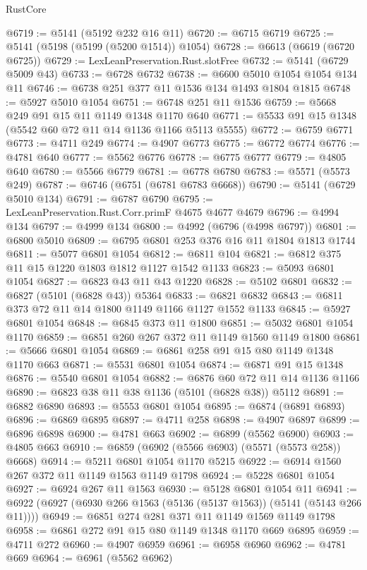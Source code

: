 \begin{lexlean}{RustCore}
\begin{coremodule}
@6719 := @5141 (@5192 @232 @16 @11)
@6720 := @6715 @6719
@6725 := @5141 (@5198 (@5199 (@5200 @1514)) @1054)
@6728 := @6613 (@6619 (@6720 @6725))
@6729 := LexLeanPreservation.Rust.slotFree
@6732 := @5141 (@6729 @5009 @43)
@6733 := @6728 @6732
@6738 := @6600 @5010 @1054 @1054 @134 @11
@6746 := @6738 @251 @377 @11 @1536 @134 @1493 @1804 @1815
@6748 := @5927 @5010 @1054
@6751 := @6748 @251 @11 @1536
@6759 := @5668 @249 @91 @15 @11 @1149 @1348 @1170 @640
@6771 := @5533 @91 @15 @1348 (@5542 @60 @72 @11 @14 @1136 @1166 @5113 @5555)
@6772 := @6759 @6771
@6773 := @4711 @249
@6774 := @4907 @6773
@6775 := @6772 @6774
@6776 := @4781 @640
@6777 := @5562 @6776
@6778 := @6775 @6777
@6779 := @4805 @640
@6780 := @5566 @6779
@6781 := @6778 @6780
@6783 := @5571 (@5573 @249)
@6787 := @6746 (@6751 (@6781 @6783 @6668))
@6790 := @5141 (@6729 @5010 @134)
@6791 := @6787 @6790
@6795 := LexLeanPreservation.Rust.Corr.primF @4675 @4677 @4679
@6796 := @4994 @134
@6797 := @4999 @134
@6800 := @4992 (@6796 (@4998 @6797))
@6801 := @6800 @5010
@6809 := @6795 @6801 @253 @376 @16 @11 @1804 @1813 @1744
@6811 := @5077 @6801 @1054
@6812 := @6811 @104
@6821 := @6812 @375 @11 @15 @1220 @1803 @1812 @1127 @1542 @1133
@6823 := @5093 @6801 @1054
@6827 := @6823 @43 @11 @43 @1220
@6828 := @5102 @6801
@6832 := @6827 (@5101 (@6828 @43)) @5364
@6833 := @6821 @6832
@6843 := @6811 @373 @72 @11 @14 @1800 @1149 @1166 @1127 @1552 @1133
@6845 := @5927 @6801 @1054
@6848 := @6845 @373 @11 @1800
@6851 := @5032 @6801 @1054 @1170
@6859 := @6851 @260 @267 @372 @11 @1149 @1560 @1149 @1800
@6861 := @5666 @6801 @1054
@6869 := @6861 @258 @91 @15 @80 @1149 @1348 @1170 @663
@6871 := @5531 @6801 @1054
@6874 := @6871 @91 @15 @1348
@6876 := @5540 @6801 @1054
@6882 := @6876 @60 @72 @11 @14 @1136 @1166
@6890 := @6823 @38 @11 @38 @1136 (@5101 (@6828 @38)) @5112
@6891 := @6882 @6890
@6893 := @5553 @6801 @1054
@6895 := @6874 (@6891 @6893)
@6896 := @6869 @6895
@6897 := @4711 @258
@6898 := @4907 @6897
@6899 := @6896 @6898
@6900 := @4781 @663
@6902 := @6899 (@5562 @6900)
@6903 := @4805 @663
@6910 := @6859 (@6902 (@5566 @6903) (@5571 (@5573 @258)) @6668)
@6914 := @5211 @6801 @1054 @1170 @5215
@6922 := @6914 @1560 @267 @372 @11 @1149 @1563 @1149 @1798
@6924 := @5228 @6801 @1054
@6927 := @6924 @267 @11 @1563
@6930 := @5128 @6801 @1054 @11
@6941 := @6922 (@6927 (@6930 @266 @1563 (@5136 (@5137 @1563)) (@5141 (@5143 @266 @11))))
@6949 := @6851 @274 @281 @371 @11 @1149 @1569 @1149 @1798
@6958 := @6861 @272 @91 @15 @80 @1149 @1348 @1170 @669 @6895
@6959 := @4711 @272
@6960 := @4907 @6959
@6961 := @6958 @6960
@6962 := @4781 @669
@6964 := @6961 (@5562 @6962)

\end{coremodule}
\end{lexlean}
